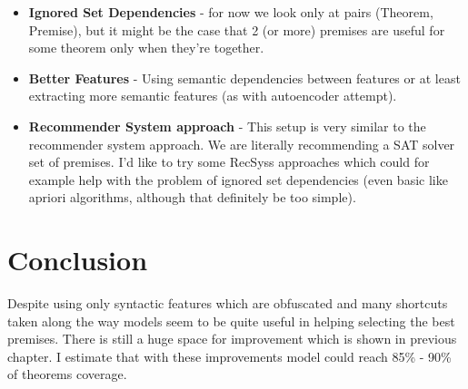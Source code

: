 \documentclass{article} %
\begin{document}
\begin{itemize}
\item \textbf{Ignored Set Dependencies} - for now we look only at pairs (Theorem, Premise), but it might be the case that 2 (or more) premises are useful for some theorem only when they're together.
\item \textbf{Better Features} - Using semantic dependencies between features or at least extracting more semantic features (as with autoencoder attempt).
\item \textbf{Recommender System approach} - This setup is very similar to the recommender system approach. We are literally recommending a SAT solver set of premises. I'd like to try some RecSyss approaches which could for example help with the problem of ignored set dependencies (even basic like apriori algorithms, although that definitely be too simple).

\end{itemize}

\section{Conclusion}

Despite using only syntactic features which are obfuscated and many shortcuts taken along the way models seem to be quite useful in helping selecting the best premises. There is still a huge space for improvement which is shown in previous chapter. I estimate that with these improvements model could reach 85\% - 90\% of theorems coverage.
\end{document}

